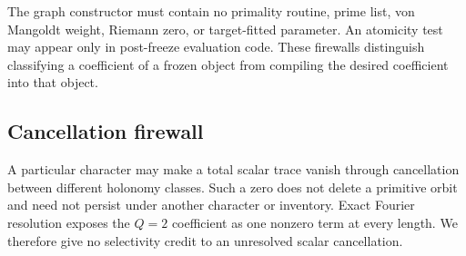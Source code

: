 The graph constructor must contain no primality routine, prime list, von
Mangoldt weight, Riemann zero, or target-fitted parameter.  An atomicity test
may appear only in post-freeze evaluation code.  These firewalls distinguish
classifying a coefficient of a frozen object from compiling the desired
coefficient into that object.

\subsection{Cancellation firewall}

A particular character may make a total scalar trace vanish through
cancellation between different holonomy classes.  Such a zero does not
delete a primitive orbit and need not persist under another character or
inventory.  Exact Fourier resolution exposes the \(Q=2\) coefficient as one
nonzero term at every length.  We therefore give no selectivity credit to an
unresolved scalar cancellation.
